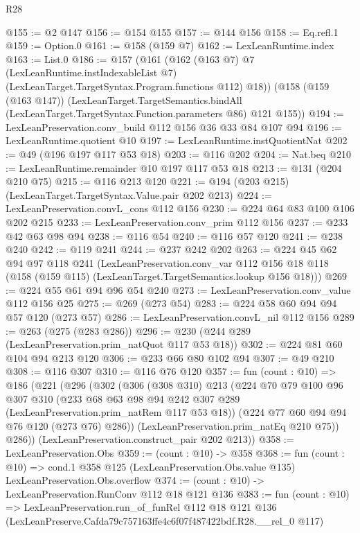 \begin{lexlean}{R28}
\begin{coremodule}
@155 := @2 @147
@156 := @154 @155
@157 := @144 @156
@158 := Eq.refl.{1}
@159 := Option.{0}
@161 := @158 (@159 @7)
@162 := LexLeanRuntime.index
@163 := List.{0}
@186 := @157
    (@161
      (@162
        (@163 @7)
        @7
        (LexLeanRuntime.instIndexableList @7)
        (LexLeanTarget.TargetSyntax.Program.functions @112)
        @18))
    (@158
      (@159 (@163 @147))
      (LexLeanTarget.TargetSemantics.bindAll
        (LexLeanTarget.TargetSyntax.Function.parameters @86)
        @121
        @155))
@194 := LexLeanPreservation.conv_build @112 @156 @36 @33 @84 @107 @94
@196 := LexLeanRuntime.quotient @10
@197 := LexLeanRuntime.instQuotientNat
@202 := @49 (@196 @197 @117 @53 @18)
@203 := @116 @202
@204 := Nat.beq
@210 := LexLeanRuntime.remainder @10 @197 @117 @53 @18
@213 := @131 (@204 @210 @75)
@215 := @116 @213 @120
@221 := @194 (@203 @215) (LexLeanTarget.TargetSyntax.Value.pair @202 @213)
@224 := LexLeanPreservation.convL_cons @112 @156
@230 := @224 @64 @83 @100 @106 @202 @215
@233 := LexLeanPreservation.conv_prim @112 @156
@237 := @233 @42 @63 @98 @94
@238 := @116 @54
@240 := @116 @57 @120
@241 := @238 @240
@242 := @119 @241
@244 := @237 @242 @202
@263 := @224
    @45
    @62
    @94
    @97
    @118
    @241
    (LexLeanPreservation.conv_var
      @112
      @156
      @18
      @118
      (@158 (@159 @115) (LexLeanTarget.TargetSemantics.lookup @156 @18)))
@269 := @224 @55 @61 @94 @96 @54 @240
@273 := LexLeanPreservation.conv_value @112 @156 @25
@275 := @269 (@273 @54)
@283 := @224 @58 @60 @94 @94 @57 @120 (@273 @57)
@286 := LexLeanPreservation.convL_nil @112 @156
@289 := @263 (@275 (@283 @286))
@296 := @230 (@244 @289 (LexLeanPreservation.prim_natQuot @117 @53 @18))
@302 := @224 @81 @60 @104 @94 @213 @120
@306 := @233 @66 @80 @102 @94
@307 := @49 @210
@308 := @116 @307
@310 := @116 @76 @120
@357 := fun (count : @10) =>
  @186
    (@221
      (@296
        (@302
          (@306
            (@308 @310)
            @213
            (@224
              @70
              @79
              @100
              @96
              @307
              @310
              (@233 @68 @63 @98 @94 @242 @307 @289 (LexLeanPreservation.prim_natRem @117 @53 @18))
              (@224 @77 @60 @94 @94 @76 @120 (@273 @76) @286))
            (LexLeanPreservation.prim_natEq @210 @75))
          @286))
      (LexLeanPreservation.construct_pair @202 @213))
@358 := LexLeanPreservation.Obs
@359 := (count : @10) -> @358
@368 := fun (count : @10) =>
  cond.{1} @358 @125 (LexLeanPreservation.Obs.value @135) LexLeanPreservation.Obs.overflow
@374 := (count : @10) -> LexLeanPreservation.RunConv @112 @18 @121 @136
@383 := fun (count : @10) =>
  LexLeanPreservation.run_of_funRel
    @112
    @18
    @121
    @136
    (LexLeanPreserve.Cafda79c757163ffe4c6f07f487422bdf.R28.__rel_0 @117)
\end{coremodule}
\end{lexlean}

